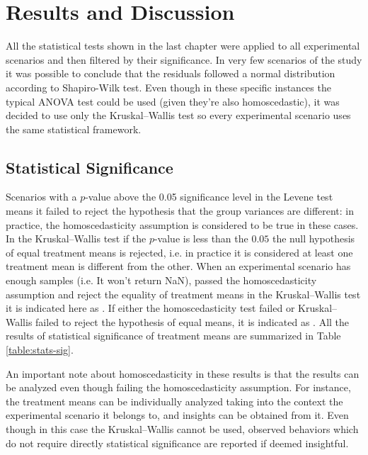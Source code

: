 \chapter{Results and Discussion}
\label{cap:results}

All the statistical tests shown in the last chapter were applied to all experimental scenarios and then filtered by their significance. In very few scenarios of the study it was possible to conclude that the residuals followed a normal distribution according to Shapiro-Wilk test. Even though in these specific instances the typical ANOVA test could be used (given they're also homoscedastic), it was decided to use only the Kruskal–Wallis test so every experimental scenario uses the same statistical framework.

\section{Statistical Significance}
\label{sec:stats-significance}

Scenarios with a $p$-value above the 0.05 significance level in the Levene test means it failed to reject the hypothesis that the group variances are different: in practice, the homoscedasticity assumption is considered to be true in these cases. In the Kruskal–Wallis test if the $p$-value is less than the $0.05$ the null hypothesis of equal treatment means is rejected, i.e. in practice it is considered at least one treatment mean is different from the other. When an experimental scenario has enough samples (i.e. It won't return NaN), passed the homoscedasticity assumption and reject the equality of treatment means in the Kruskal–Wallis test it is indicated here as \ok. If either the homoscedasticity test failed or Kruskal–Wallis failed to reject the hypothesis of equal means, it is indicated as \notok. All the results of statistical significance of treatment means are summarized in Table \ref{table:stats-sig}.

An important note about homoscedasticity in these results is that the results can be analyzed even though failing the homoscedasticity assumption. For instance, the treatment means can be individually analyzed taking into the context the experimental scenario it belongs to, and insights can be obtained from it. Even though in this case the Kruskal–Wallis cannot be used, observed behaviors which do not require directly statistical significance are reported if deemed insightful.

